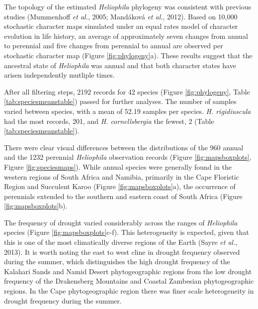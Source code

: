 \documentclass[man,floatsintext]{apa6}
\theoremstyle{definition}
\theoremstyle{definition}
\theoremstyle{definition}
\theoremstyle{remark}
\begin{document}
The topology of the estimated \emph{Heliophila} phylogeny was consistent
with previous studies (Mummenhoff \emph{et al.}, 2005; Mandáková
\emph{et al.}, 2012). Based on 10,000 stochastic character maps
simulated under an equal rates model of character evolution in life
history, an average of approximately seven changes from annual to
perennial and five changes from perennial to annual are observed per
stochastic character map (Figure \ref{fig:phylogeny}a). These results
suggest that the ancestral state of \emph{Heliophila} was annual and
that both character states have arisen independently mutliple times.

After all filtering steps, 2192 records for 42 species (Figure
\ref{fig:phylogeny}, Table \ref{tab:speciesmeanstable}) passed for
further analyses. The number of samples varied between species, with a
mean of 52.19 samples per species. \emph{H. rigidiuscula} had the most
records, 201, and \emph{H. cornellsbergia} the fewest, 2 (Table
\ref{tab:speciesmeanstable}).

There were clear visual differences between the distributions of the 960
annual and the 1232 perennial \emph{Heliophila} observation records
(Figure \ref{fig:mapsboxplots}, Figure \ref{fig:speciesmaps}). While
annual species were generally found in the western regions of South
Africa and Namibia, primarily in the Cape Floristic Region and Succulent
Karoo (Figure \ref{fig:mapsboxplots}a), the occurrence of perennials
extended to the southern and eastern coast of South Africa (Figure
\ref{fig:mapsboxplots}b).

The frequency of drought varied considerably across the ranges of
\emph{Heliophila} species (Figure \ref{fig:mapsboxplots}c-f). This
heterogeneity is expected, given that this is one of the most
climatically diverse regions of the Earth (Sayre \emph{et al.}, 2013).
It is worth noting the east to west cline in drought frequency observed
during the summer, which distinguishes the high drought frequency of the
Kalahari Sands and Namid Desert phytogeographic regions from the low
drought frequency of the Drakensberg Mountains and Coastal Zambesian
phytogeographic regions. In the Cape phytogeographic region there was
finer scale heterogeneity in drought frequency during the summer.
\end{document}
